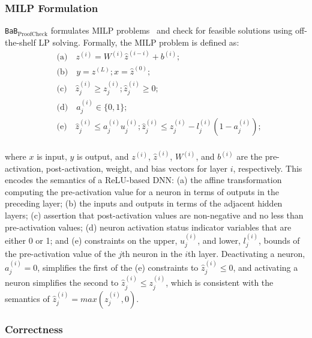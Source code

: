 \documentclass[oneside,11pt,dvipsnames]{book}
\newcommand{\proofcheck}{\texttt{BaB$_{\text{ProofCheck}}$}}
\begin{document}
\subsubsection{MILP Formulation}\label{sec:milp}

\proofcheck{} formulates MILP problems~\cite{tjeng2019evaluating} and check for feasible solutions using off-the-shelf LP solving. Formally, the MILP problem is defined as:
\begin{equation}
    \begin{aligned}
        &\mbox{(a)}\quad z^{(i)} = W^{(i)} \hat{z}^{(i-i)} + b^{(i)};\\
        &\mbox{(b)}\quad y = z^{(L)};  x = \hat{z}^{(0)}; \\
        &\mbox{(c)}\quad \hat{z}_j^{(i)} \ge {z}_j^{(i)}; \hat{z}_j^{(i)} \ge 0; \\
        &\mbox{(d)}\quad a_j^{(i)} \in \{ 0, 1\} ;\\
        &\mbox{(e)}\quad \hat{z}_j^{(i)} \le {a}_j^{(i)} {u}_j^{(i)}; \hat{z}_j^{(i)} \le {z}_j^{(i)} - {l}_j^{(i)}(1 - {a}_j^{(i)}); \\
    \end{aligned}
    \label{eq:mip}
\end{equation}

\noindent where $x$ is input, $y$ is output, and $z^{(i)}$, $\hat{z}^{(i)}$, $W^{(i)}$, and $b^{(i)}$ are the pre-activation, post-activation, weight, and bias vectors for layer $i$, respectively. 
This encodes the semantics of a ReLU-based DNN:  
(a) the affine transformation computing the pre-activation value for a neuron in terms of outputs in the preceding layer;
(b) the inputs and outputs in terms of the adjacent hidden layers;
(c) assertion that post-activation values are non-negative and no less than pre-activation values;
(d) neuron activation status indicator variables that are either 0 or 1; and
(e) constraints on the upper, $u_j^{(i)}$, and lower, $l_j^{(i)}$, bounds of the pre-activation value of the $j$th neuron in the $i$th layer.
Deactivating a neuron, $a_j^{(i)} = 0$, simplifies the first of the (e) constraints to $\hat{z}_j^{(i)} \le 0$, and activating a neuron simplifies the second to $\hat{z}_j^{(i)} \le z_j^{(i)}$, which is consistent with the semantics of $\hat{z}_j^{(i)} = max(z_j^{(i)},0)$.


\subsubsection{Correctness}\label{sec:checker-core-correctness}
\end{document}
